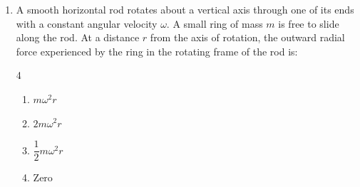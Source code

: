 \documentclass[11pt,a4paper]{article}
\begin{document}
\begin{enumerate}[label=\textbf{\arabic*.},leftmargin=18pt,itemsep=8pt,resume]
  \item A smooth horizontal rod rotates about a vertical axis through one of its ends with a constant angular velocity $\omega$. A small ring of mass $m$ is free to slide along the rod. At a distance $r$ from the axis of rotation, the outward radial force experienced by the ring in the rotating frame of the rod is:
  \begin{multicols}{4}
    \begin{enumerate}[label=(\Alph*)]
      \item $m\omega^2 r$
      \item $2m\omega^2 r$
      \item $\dfrac{1}{2}m\omega^2 r$
      \item $\text{Zero}$
    \end{enumerate}
  \end{multicols}

\end{enumerate}

\vspace{8pt}
\noindent{\textbf{\textsf{\textcolor{l3Crimson}{Section B: High-Yield JEE Integer Numericals (Q70 -- Q75)}}}}
\vspace{2pt}
\end{document}
